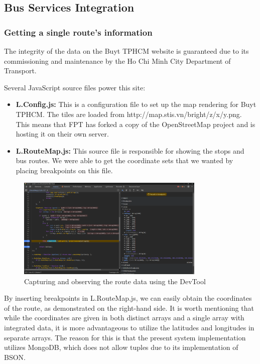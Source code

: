 \subsection{Bus Services Integration}

\subsubsection{Getting a single route's information}

The integrity of the data on the Buyt TPHCM website is guaranteed due to its commissioning and maintenance by the Ho Chi Minh City Department of Transport. 

Several JavaScript source files power this site:
\begin{itemize}
    \item \textbf{L.Config.js:} This is a configuration file to set up the map rendering for Buyt TPHCM. The tiles are loaded from http://map.stis.vn/bright/{z}/{x}/{y}.png. This means that FPT has forked a copy of the OpenStreetMap project and is hosting it on their own server.
    \item \textbf{L.RouteMap.js:} This source file is responsible for showing the stops and bus routes. We were able to get the coordinate sets that we wanted by placing breakpoints on this file.
\end{itemize}

\begin{figure}[H]
    \centering
    \includegraphics[width=0.8\textwidth]{assets/images/Research/Bus/lat_long_web.png}
    \caption{Capturing and observing the route data using the DevTool}
    \label{fig:lat_long_web}
\end{figure}

By inserting breakpoints in L.RouteMap.js, we can easily obtain the coordinates of the route, as demonstrated on the right-hand side. It is worth mentioning that while the coordinates are given in both distinct arrays and a single array with integrated data, it is more advantageous to utilize the latitudes and longitudes in separate arrays. The reason for this is that the present system implementation utilizes MongoDB, which does not allow tuples due to its implementation of BSON.

